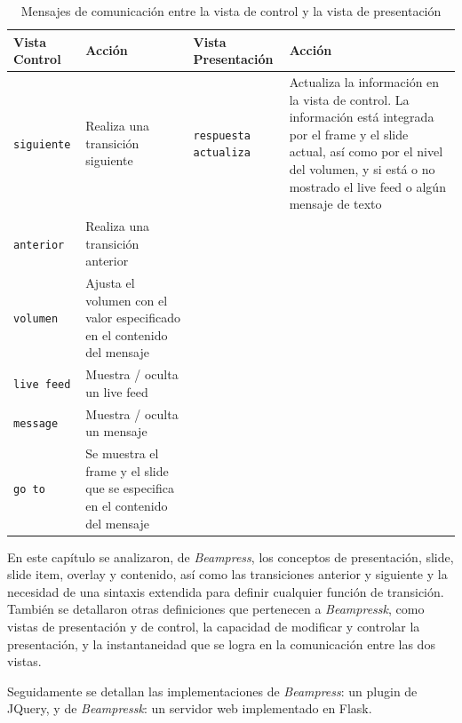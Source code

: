 			\begin{table}[b]
				\caption{Mensajes de comunicación entre la vista de control y la vista de presentación}
				\label{tab:messages}
				\centering
			
				\begin{tabular}{| m{2cm} | m{3cm} | m{2.5cm} | m{3cm} |}
				\hline
			
				\hline
					\textbf{Vista Control} & \textbf{Acción} & \textbf{Vista \newline Presentación} & \textbf{Acción} \\
				\hline
					\texttt{siguiente} & Realiza una transición siguiente & \texttt{respuesta actualiza} & Actualiza la información en la vista de control. La información está integrada por el frame y el slide actual, así como por el nivel del volumen, y si está o no mostrado el live feed o algún mensaje de texto  \\ \cline{1-2}
					\texttt{anterior} & Realiza una transición anterior &   &  \\ \cline{1-2}

					\texttt{volumen} & Ajusta el volumen con el valor especificado en el contenido del mensaje &  &  \\ \cline{1-2}

					\texttt{live feed} & Muestra / oculta un live feed &  &  \\ \cline{1-2}

					\texttt{message} & Muestra / oculta un mensaje &  &  \\ \cline{1-2}

					\texttt{go to} & Se muestra el frame y el slide que se especifica en el contenido del mensaje &  &  \\ 
				\hline																																
			
				\hline
				\end{tabular}
			\end{table}	


		En este capítulo se analizaron, de \textit{Beampress}, los conceptos de presentación, slide, slide item, overlay y contenido, así como las transiciones anterior y siguiente y la necesidad de una sintaxis extendida para definir cualquier función de transición. También se detallaron otras definiciones que pertenecen a \textit{Beampressk}, como vistas de presentación y de control, la capacidad de modificar y controlar la presentación, y la instantaneidad que se logra en la comunicación entre las dos vistas.

		Seguidamente se detallan las implementaciones de \textit{Beampress}: un plugin de JQuery, y de \textit{Beampressk}: un servidor web implementado en Flask.


	





